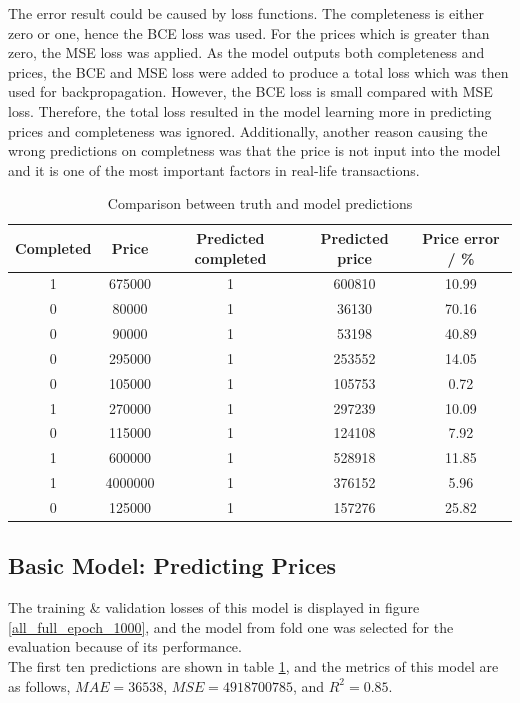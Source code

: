 \documentclass[12pt,twoside]{report}
\begin{document}
The error result could be caused by loss functions. The completeness is either zero or one, hence the BCE loss was used. For the prices which is greater than zero, the MSE loss was applied. As the model outputs both completeness and prices, the BCE and MSE loss were added to produce a total loss which was then used for backpropagation. However, the BCE loss is small compared with MSE loss. Therefore, the total loss resulted in the model learning more in predicting prices and completeness was ignored. Additionally, another reason causing the wrong predictions on completness was that the price is not input into the model and it is one of the most important factors in real-life transactions. 
\begin{table}[h]
	\centering
	\caption{Comparison between truth and model predictions}
	\label{first_model_predictions}
	\begin{tabular}{| c | c | c | c | c |}
		\hline
		Completed & Price & Predicted completed & Predicted price & Price error  / \%\\ 
		\hline
		1 & 675000 & 1 & 600810 & 10.99 \\
		\hline
		0 & 80000 & 1 & 36130 & 70.16 \\
		\hline
		0 & 90000 & 1 & 53198 & 40.89  \\
		\hline
		0 & 295000 & 1 & 253552 & 14.05  \\
		\hline
		0 & 105000 & 1 & 105753 & 0.72  \\ 
		\hline
		1 & 270000 & 1 & 297239 & 10.09  \\
		\hline
		0 & 115000 & 1 & 124108 & 7.92  \\
		\hline
		1 & 600000 & 1 & 528918 & 11.85  \\
		\hline
		1 & 4000000 & 1 & 376152 & 5.96  \\
		\hline
		0 & 125000 & 1 & 157276 & 25.82  \\
		\hline
	\end{tabular}
\end{table}

\subsection{Basic Model: Predicting Prices}
The training \& validation losses of this model is displayed in figure \ref{all_full_epoch_1000}, and the model from fold one was selected for the evaluation because of its performance. 
\\

The first ten predictions are shown in table \ref{first_model_predictions}, and the metrics of this model are as follows, $MAE = 36538$, $MSE = 4918700785$, and $R^2 = 0.85$. 
\end{document}
